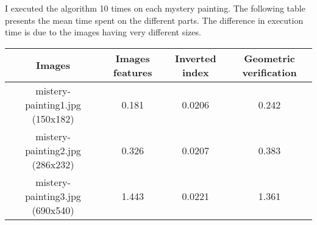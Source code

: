 \documentclass{article}
\begin{document}
I executed the algorithm 10 times on each mystery painting. The
following table presents the mean time spent on the different parts.
The difference in execution time is due to the images having very
different sizes.

\begin{center}
  \begin{tabular}{| c | c | c | c |}
    \hline
    Images & Images features & Inverted index & Geometric verification \\
    \hline
    mistery-painting1.jpg (150x182) & 0.181 & 0.0206 & 0.242 \\
    mistery-painting2.jpg (286x232) & 0.326 & 0.0207 & 0.383 \\
    mistery-painting3.jpg (690x540) & 1.443 & 0.0221 & 1.361 \\
    \hline
  \end{tabular}
\end{center}








\end{document}
